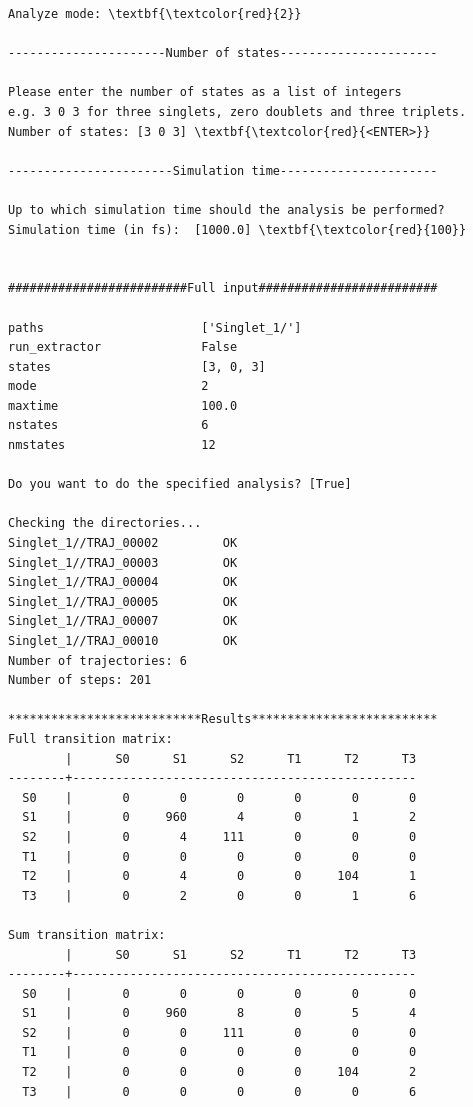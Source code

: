 \documentclass[a4paper,11pt,DIV=15,openany]{scrbook}
\begin{document}
\begin{oframed}
\begin{Verbatim}[commandchars=\\\{\}]
Analyze mode: \textbf{\textcolor{red}{2}}

----------------------Number of states----------------------

Please enter the number of states as a list of integers
e.g. 3 0 3 for three singlets, zero doublets and three triplets.
Number of states: [3 0 3] \textbf{\textcolor{red}{<ENTER>}}

-----------------------Simulation time----------------------

Up to which simulation time should the analysis be performed?
Simulation time (in fs):  [1000.0] \textbf{\textcolor{red}{100}}


#########################Full input#########################

paths                      ['Singlet_1/']
run_extractor              False
states                     [3, 0, 3]
mode                       2
maxtime                    100.0
nstates                    6
nmstates                   12

Do you want to do the specified analysis? [True] 

Checking the directories...
Singlet_1//TRAJ_00002         OK
Singlet_1//TRAJ_00003         OK
Singlet_1//TRAJ_00004         OK
Singlet_1//TRAJ_00005         OK
Singlet_1//TRAJ_00007         OK
Singlet_1//TRAJ_00010         OK
Number of trajectories: 6
Number of steps: 201

***************************Results**************************
Full transition matrix:
        |      S0      S1      S2      T1      T2      T3
--------+------------------------------------------------
  S0    |       0       0       0       0       0       0
  S1    |       0     960       4       0       1       2
  S2    |       0       4     111       0       0       0
  T1    |       0       0       0       0       0       0
  T2    |       0       4       0       0     104       1
  T3    |       0       2       0       0       1       6

Sum transition matrix:
        |      S0      S1      S2      T1      T2      T3
--------+------------------------------------------------
  S0    |       0       0       0       0       0       0
  S1    |       0     960       8       0       5       4
  S2    |       0       0     111       0       0       0
  T1    |       0       0       0       0       0       0
  T2    |       0       0       0       0     104       2
  T3    |       0       0       0       0       0       6


\end{Verbatim}
\end{oframed}
\end{document}
